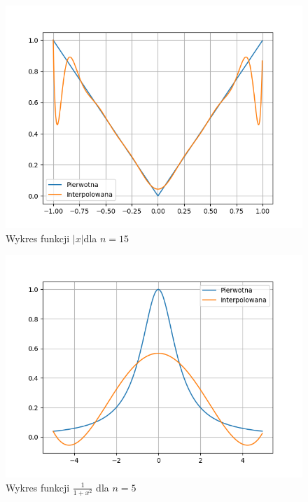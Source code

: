 \documentclass[a4paper,14pt]{report}
\begin{document}
    \begin{figure}[H]
      \includegraphics[scale=0.75]{c-15}
      \centering
      \caption{Wykres funkcji $|x|$dla $n=15$}
    \end{figure}
    \begin{figure}[H]
      \includegraphics[scale=0.75]{d-5}
      \centering
      \caption{Wykres funkcji $\frac{1}{1+x^{2}}$ dla $n=5$}
    \end{figure}
\end{document}
